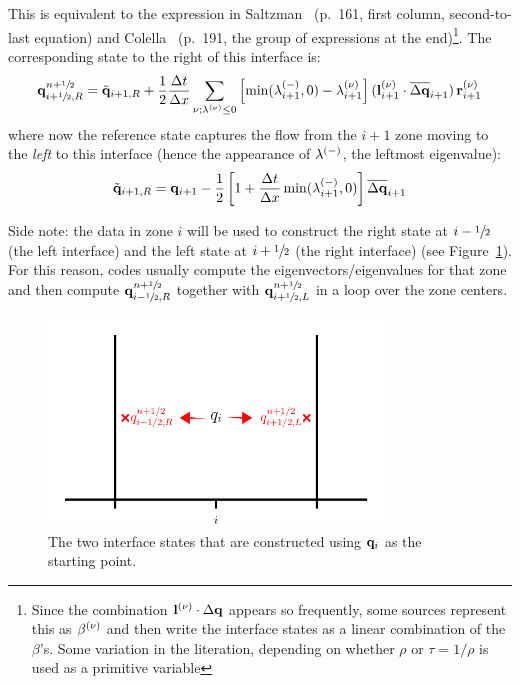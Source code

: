This is equivalent to the expression in Saltzman~\cite{saltzman:1994}
(p.\ 161, first column, second-to-last equation) and
Colella~\cite{colella:1990} (p.\ 191, the group of expressions at the
end)\footnote{Since the combination ${\bf l}^{(\nu)} \cdot \Delta {\bf q}$
  appears so frequently, some sources represent this as $\beta^{(\nu)}$
  and then write the interface states as a linear combination of the
  $\beta$'s.  Some variation in the literation, depending on whether $\rho$
  or $\tau = 1/\rho$ is used as a primitive variable}.  The corresponding
  state to the right of this interface is:
\begin{equation}
{\bf q}_{i+{\sfrac{1}{2}},R}^{n+{\sfrac{1}{2}}} = \tilde{{\bf q}}_{i+1,R} + \frac{1}{2} \frac{\Delta t}{\Delta x}
       \sum_{\nu; \lambda^{(\nu)} \le 0}
       \left [ \min(\lambda_{i+1}^{(-)},0) - \lambda_{i+1}^{(\nu)} \right ]
       ({\bf l}_{i+1}^{(\nu)} \cdot \overline{\Delta {\bf q}}_{i+1}) \, {\bf r}_{i+1}^{(\nu)}
\end{equation}
where now the reference state captures the flow from the $i+1$ zone
moving to the {\em left} to this interface (hence the appearance of
$\lambda^{(-)}$, the leftmost eigenvalue):
\begin{equation}
\tilde{{\bf q}}_{i+1,R} = {\bf q}_{i+1} - \frac{1}{2} \left [ 1 + \frac{\Delta t}{\Delta x} \min(\lambda_{i+1}^{(-)},0) \right ] \overline{\Delta {\bf q}}_{i+1}
\end{equation}

Side note: the data in zone $i$ will be used to construct the right
state at $i-{\sfrac{1}{2}}$ (the left interface) and the left state at $i+{\sfrac{1}{2}}$
(the right interface) (see Figure~\ref{fig:states}).  For this reason,
codes usually compute the eigenvectors/eigenvalues for that zone and
then compute ${\bf q}_{i-{\sfrac{1}{2}},R}^{n+{\sfrac{1}{2}}}$ together with ${\bf q}_{i+{\sfrac{1}{2}},L}^{n+{\sfrac{1}{2}}}$
in a loop over the zone centers.

\begin{figure}
\centering
\includegraphics[width=3.5in]{states}
\caption[The two interface states derived from a cell-center quantity]{\label{fig:states} The two interface states that are constructed
using ${\bf q}_i$ as the starting point.}
\end{figure}

